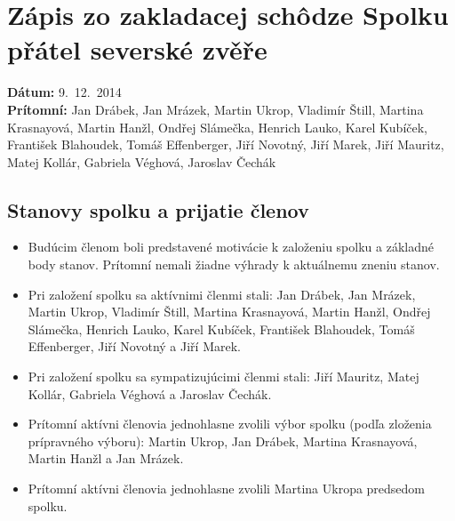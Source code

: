 \documentclass[11pt,a4paper]{article}
\begin{document}
\section*{Zápis zo zakladacej schôdze Spolku přátel severské zvěře}
\textbf{Dátum:} 9.\ 12.\ 2014\\
\textbf{Prítomní:} Jan Drábek, Jan Mrázek, Martin Ukrop, Vladimír Štill, Martina Krasnayová, Martin Hanžl, Ondřej Slámečka, Henrich Lauko, Karel Kubíček, František Blahoudek, Tomáš Effenberger, Jiří Novotný, Jiří Marek, Jiří Mauritz, Matej Kollár, Gabriela Véghová, Jaroslav Čechák

\subsection*{Stanovy spolku a prijatie členov}
\begin{itemize}[itemsep=0pt]
\item Budúcim členom boli predstavené motivácie k založeniu spolku a základné body stanov. Prítomní nemali žiadne výhrady k aktuálnemu zneniu stanov.
\item Pri založení spolku sa aktívnimi členmi stali: Jan Drábek, Jan Mrázek, Martin Ukrop, Vladimír Štill, Martina Krasnayová, Martin Hanžl, Ondřej Slámečka, Henrich Lauko, Karel Kubíček, František Blahoudek, Tomáš Effenberger, Jiří Novotný a Jiří Marek.
\item Pri založení spolku sa sympatizujúcimi členmi stali: Jiří Mauritz, Matej Kollár, Gabriela Véghová a Jaroslav Čechák.
\item Prítomní aktívni členovia jednohlasne zvolili výbor spolku (podľa zloženia prípravného výboru): Martin Ukrop, Jan Drábek, Martina Krasnayová, Martin Hanžl a Jan Mrázek.
\item Prítomní aktívni členovia jednohlasne zvolili Martina Ukropa predsedom spolku.
\end{itemize}
\end{document}
